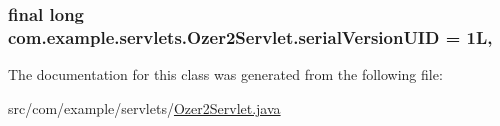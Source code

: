 \subsubsection[{serial\+Version\+U\+I\+D}]{\setlength{\rightskip}{0pt plus 5cm}final long com.\+example.\+servlets.\+Ozer2\+Servlet.\+serial\+Version\+U\+I\+D = 1\+L\hspace{0.3cm}{\ttfamily [static]}, {\ttfamily [private]}}\label{classcom_1_1example_1_1servlets_1_1_ozer2_servlet_adda557e8b6e5941a32e2aa6a66ad1295}


The documentation for this class was generated from the following file\+:\begin{DoxyCompactItemize}
\item 
src/com/example/servlets/\hyperlink{_ozer2_servlet_8java}{Ozer2\+Servlet.\+java}\end{DoxyCompactItemize}
